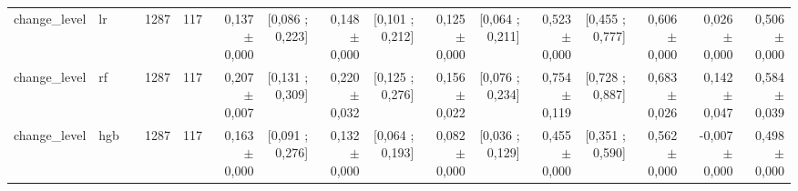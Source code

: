 \begin{table}[htbp]
{\begin{tabular}{llrrrrrrrrrrrrrr}
change\_level & lr &  & 1287 & 117 & 0,137 $\pm$ 0,000 & [0,086 ; 0,223] & 0,148 $\pm$ 0,000 & [0,101 ; 0,212] & 0,125 $\pm$ 0,000 & [0,064 ; 0,211] & 0,523 $\pm$ 0,000 & [0,455 ; 0,777] & 0,606 $\pm$ 0,000 & 0,026 $\pm$ 0,000 & 0,506 $\pm$ 0,000 \\
change\_level & rf &  & 1287 & 117 & 0,207 $\pm$ 0,007 & [0,131 ; 0,309] & 0,220 $\pm$ 0,032 & [0,125 ; 0,276] & 0,156 $\pm$ 0,022 & [0,076 ; 0,234] & 0,754 $\pm$ 0,119 & [0,728 ; 0,887] & 0,683 $\pm$ 0,026 & 0,142 $\pm$ 0,047 & 0,584 $\pm$ 0,039 \\
change\_level & hgb &  & 1287 & 117 & 0,163 $\pm$ 0,000 & [0,091 ; 0,276] & 0,132 $\pm$ 0,000 & [0,064 ; 0,193] & 0,082 $\pm$ 0,000 & [0,036 ; 0,129] & 0,455 $\pm$ 0,000 & [0,351 ; 0,590] & 0,562 $\pm$ 0,000 & -0,007 $\pm$ 0,000 & 0,498 $\pm$ 0,000 \\
\bottomrule
\end{tabular}}
\end{table}
